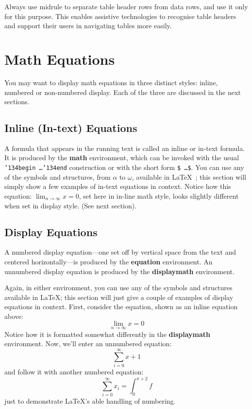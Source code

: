 \documentclass[sigconf,anonymous,review]{acmart}
\begin{document}
Always use midrule to separate table header rows from data rows, and use it only
for this purpose. This enables assistive technologies to recognise table headers
and support their users in navigating tables more easily.

\section{Math Equations}
You may want to display math equations in three distinct styles: inline,
numbered or non-numbered display.  Each of the three are discussed in the next
sections.

\subsection{Inline (In-text) Equations}
A formula that appears in the running text is called an inline or in-text
formula.  It is produced by the \textbf{math} environment, which can be invoked
with the usual \texttt{{\char'134}begin\,\ldots{\char'134}end} construction or
with the short form \texttt{\$\,\ldots\$}. You can use any of the symbols and
structures, from $\alpha$ to $\omega$, available in \LaTeX~\cite{Lamport:LaTeX};
this section will simply show a few examples of in-text equations in context.
Notice how this equation:
\begin{math}
  \lim_{n\rightarrow \infty}x=0
\end{math},
set here in in-line math style, looks slightly different when set in display
style.  (See next section).

\subsection{Display Equations}
A numbered display equation---one set off by vertical space from the text and
centered horizontally---is produced by the \textbf{equation} environment. An
unnumbered display equation is produced by the \textbf{displaymath} environment.

Again, in either environment, you can use any of the symbols and structures
available in \LaTeX\@; this section will just give a couple of examples of
display equations in context.  First, consider the equation, shown as an inline
equation above:
\begin{equation}
  \lim_{n\rightarrow \infty}x=0
\end{equation}
Notice how it is formatted somewhat differently in the \textbf{displaymath}
environment.  Now, we'll enter an unnumbered equation:
\begin{displaymath}
  \sum_{i=0}^{\infty} x + 1
\end{displaymath}
and follow it with another numbered equation:
\begin{equation}
  \sum_{i=0}^{\infty}x_i=\int_{0}^{\pi+2} f
\end{equation}
just to demonstrate \LaTeX's able handling of numbering.
\end{document}
